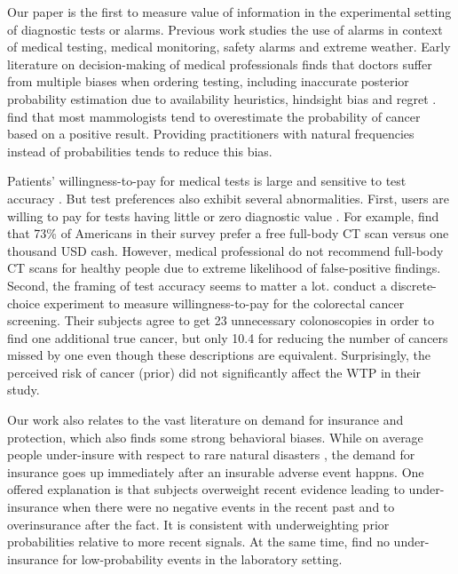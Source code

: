\documentclass[12pt,a4paper]{article}
\begin{document}
Our paper is the first to measure value of information in the experimental setting of diagnostic tests or alarms. Previous work studies the use of alarms in context of medical testing, medical monitoring, safety alarms and extreme weather. Early literature on decision-making of medical professionals finds that doctors suffer from multiple biases when ordering testing, including  inaccurate posterior probability estimation due to availability heuristics, hindsight bias and regret \citep{bornstein_rationality_2001}. \citet{gigerenzer_helping_2007} find that most mammologists tend to overestimate the probability of cancer based on a positive result. Providing practitioners with natural frequencies instead of probabilities tends to reduce this bias.  

Patients' willingness-to-pay for medical tests is large and sensitive to test accuracy \citep{liang_acceptability_2003, howard_does_2009, neumann_willingness--pay_2012}. But test preferences also exhibit several abnormalities. First, users are willing to pay for tests having little or zero diagnostic value \citep{schwartz_enthusiasm_2004, neumann_willingness--pay_2012}. For example, \citet{schwartz_enthusiasm_2004} find that 73\% of Americans in their survey prefer a free full-body CT scan versus one thousand USD cash. However, medical professional do not recommend full-body CT scans for healthy people due to extreme likelihood of false-positive findings. Second, the framing of test accuracy seems to matter a lot. \citet{howard_does_2009} conduct a discrete-choice experiment to measure willingness-to-pay for the colorectal cancer screening. Their subjects agree to get 23 unnecessary colonoscopies in order to find one additional true cancer, but only 10.4 for reducing the number of cancers missed by one even though these descriptions are equivalent. Surprisingly, the perceived risk of cancer (prior) did not significantly affect the WTP in their study.

Our work also relates to the vast literature on demand for insurance and protection, which also finds some strong behavioral biases. While on average people under-insure with respect to rare natural disasters \citep{friedl_insurance_2014}, the demand for insurance goes up immediately after an insurable adverse event happns. One offered explanation \citep{volkman-wise_representativeness_2015} is that subjects overweight recent evidence leading to under-insurance when there were no negative events in the recent past and to overinsurance after the fact. It is consistent with underweighting prior probabilities relative to more recent signals. At the same time, \citet{laury_insurance_2009} find no under-insurance for low-probability events in the laboratory setting.  
\end{document}
